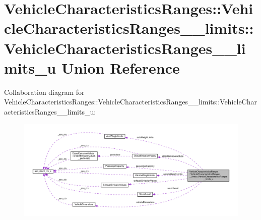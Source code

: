 \hypertarget{unionVehicleCharacteristicsRanges_1_1VehicleCharacteristicsRanges____limits_1_1VehicleCharacteristicsRanges____limits__u}{}\section{Vehicle\+Characteristics\+Ranges\+:\+:Vehicle\+Characteristics\+Ranges\+\_\+\+\_\+limits\+:\+:Vehicle\+Characteristics\+Ranges\+\_\+\+\_\+limits\+\_\+u Union Reference}
\label{unionVehicleCharacteristicsRanges_1_1VehicleCharacteristicsRanges____limits_1_1VehicleCharacteristicsRanges____limits__u}


Collaboration diagram for Vehicle\+Characteristics\+Ranges\+:\+:Vehicle\+Characteristics\+Ranges\+\_\+\+\_\+limits\+:\+:Vehicle\+Characteristics\+Ranges\+\_\+\+\_\+limits\+\_\+u\+:\nopagebreak
\begin{figure}[H]
\begin{center}
\leavevmode
\includegraphics[width=350pt]{unionVehicleCharacteristicsRanges_1_1VehicleCharacteristicsRanges____limits_1_1VehicleCharacteri5277871d33e510dc953e83444044ee51}
\end{center}
\end{figure}
